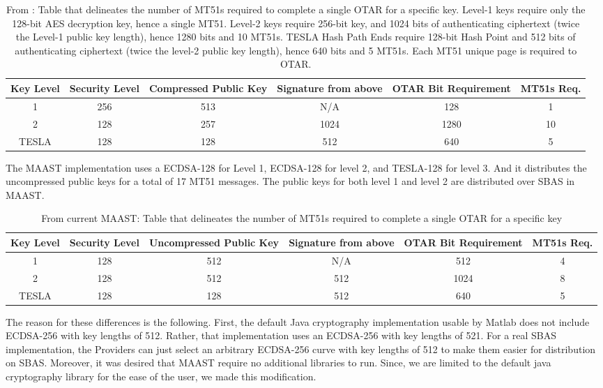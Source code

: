 \documentclass[letterpaper,times]{IONconf/IONconf}
\begin{document}
	\begin{table}[H]
	\center
	\begin{tabular}{|c|c|c|c|c|c|} \hline
		Key Level & Security Level & Compressed Public Key  & Signature from above & OTAR Bit Requirement & MT51s Req. \\ \hline
		    1 & 256 & 513 & N/A & 128 & 1 \\ \hline
		    2 & 128 & 257 & 1024 & 1280 & 10\\ \hline
		TESLA & 128 & 128 & 512 & 640 & 5 \\ \hline
	\end{tabular}
	\caption{From \cite{Anderson2021}: Table that delineates the number of MT51s required to complete a single OTAR for a specific key. Level-1 keys require only the 128-bit AES decryption key, hence a single MT51. Level-2 keys require 256-bit key, and 1024 bits of authenticating ciphertext (twice the Level-1 public key length), hence 1280 bits and 10 MT51s. TESLA Hash Path Ends require 128-bit Hash Point and 512 bits of authenticating ciphertext (twice the level-2 public key length), hence 640 bits and 5 MT51s. Each MT51 unique page is required to OTAR.}
	\label{tab: paper ciphertext lengths}
	\end{table}

	The MAAST implementation uses a ECDSA-128 for Level 1, ECDSA-128 for level 2, and TESLA-128 for level 3. 
	And it distributes the uncompressed public keys for a total of 17 MT51 messages.
	The public keys for both level 1 and level 2 are distributed over SBAS in MAAST.

	\begin{table}[H]
	\center
	\begin{tabular}{|c|c|c|c|c|c|} \hline
		Key Level & Security Level & Uncompressed Public Key & Signature from above & OTAR Bit Requirement & MT51s Req. \\ \hline
		    1 & 128 & 512 & N/A & 512 & 4 \\ \hline
		    2 & 128 & 512 & 512 & 1024 & 8\\ \hline
		TESLA & 128 & 128 & 512 & 640 & 5 \\ \hline
	\end{tabular}
	\caption{From current MAAST: Table that delineates the number of MT51s required to complete a single OTAR for a specific key}
	\label{tab: maast ciphertext lengths}
	\end{table}

	The reason for these differences is the following.
	First, the default Java cryptography implementation usable by Matlab does not include ECDSA-256 with key lengths of 512.
	Rather, that implementation uses an ECDSA-256 with key lengths of 521.
	For a real SBAS implementation, the Providers can just select an arbitrary ECDSA-256 curve with key lengths of 512 to make them easier for distribution on SBAS.
	Moreover, it was desired that MAAST require no additional libraries to run.
	Since, we are limited to the default java cryptography library for the ease of the user, we made this modification.
\end{document}
